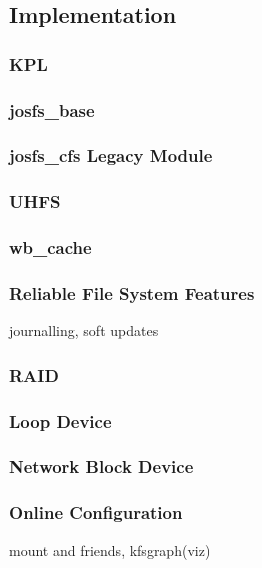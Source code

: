 \subsection{Implementation}
\label{subsec:impl}

\subsubsection{KPL}
\subsubsection{josfs\_base}
\subsubsection{josfs\_cfs Legacy Module}
\subsubsection{UHFS}
\subsubsection{wb\_cache}
\subsubsection{Reliable File System Features}
journalling, soft updates
\subsubsection{RAID}
\subsubsection{Loop Device}
\subsubsection{Network Block Device}
\subsubsection{Online Configuration}
mount and friends, kfsgraph(viz)
